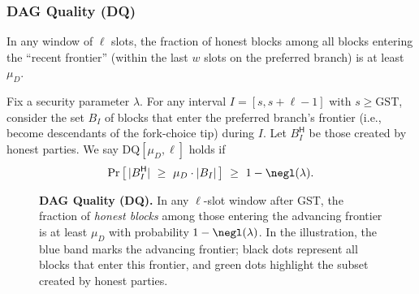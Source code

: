 \subsubsection{DAG Quality (DQ)} 
\label{sec:DQ}

In any window of $\ell$ slots, the fraction of honest blocks among all blocks entering the “recent frontier” (within the last $w$ slots on the preferred branch) is at least $\mu_D$.



\begin{definition}\label{def:DQ}
Fix a security parameter $\lambda$. For any interval $I=[s,s+\ell-1]$ with $s\ge \mathrm{GST}$, consider the set $B_I$ of blocks that enter the preferred branch's frontier (i.e., become descendants of the fork-choice tip) during $I$. Let $B_I^{\mathsf{H}}$ be those created by honest parties.
We say $\mathrm{DQ}[\mu_D,\ell]$ holds if
\begin{equation*}
\Pr\big[\,|B_I^{\mathsf{H}}|\ \ge\ \mu_D \cdot |B_I|\,\big]\ \ge\ 1-\negl(\lambda).
\end{equation*}
\end{definition}

\begin{figure}[htp!]
\centering
{}
\caption{\textbf{DAG Quality (DQ).} 
\small 
In any $\ell$-slot window after GST, the fraction of \emph{honest blocks} among those entering the advancing frontier is at least $\mu_D$ with probability $1-\negl(\lambda)$. 
In the illustration, the blue band marks the advancing frontier; 
black dots represent all blocks that enter this frontier, 
and green dots highlight the subset created by honest parties.}
\label{fig:dq}
\end{figure}





